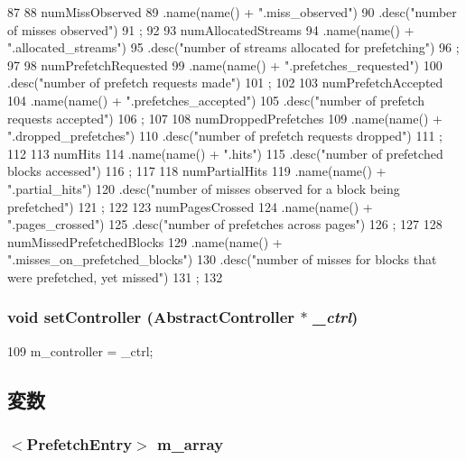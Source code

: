 \begin{DoxyCode}
87 {
88     numMissObserved
89         .name(name() + ".miss_observed")
90         .desc("number of misses observed")
91         ;
92 
93     numAllocatedStreams
94         .name(name() + ".allocated_streams")
95         .desc("number of streams allocated for prefetching")
96         ;
97 
98     numPrefetchRequested
99         .name(name() + ".prefetches_requested")
100         .desc("number of prefetch requests made")
101         ;
102 
103     numPrefetchAccepted
104         .name(name() + ".prefetches_accepted")
105         .desc("number of prefetch requests accepted")
106         ;
107 
108     numDroppedPrefetches
109         .name(name() + ".dropped_prefetches")
110         .desc("number of prefetch requests dropped")
111         ;
112 
113     numHits
114         .name(name() + ".hits")
115         .desc("number of prefetched blocks accessed")
116         ;
117 
118     numPartialHits
119         .name(name() + ".partial_hits")
120         .desc("number of misses observed for a block being prefetched")
121         ;
122 
123     numPagesCrossed
124         .name(name() + ".pages_crossed")
125         .desc("number of prefetches across pages")
126         ;
127 
128     numMissedPrefetchedBlocks
129         .name(name() + ".misses_on_prefetched_blocks")
130         .desc("number of misses for blocks that were prefetched, yet missed")
131         ;
132 }
\end{DoxyCode}
\hypertarget{classPrefetcher_ad1772ea493bb64a517a46484972c9efc}{
\subsubsection[{setController}]{\setlength{\rightskip}{0pt plus 5cm}void setController ({\bf AbstractController} $\ast$ {\em \_\-ctrl})}}
\label{classPrefetcher_ad1772ea493bb64a517a46484972c9efc}



\begin{DoxyCode}
109         { m_controller = _ctrl; }
\end{DoxyCode}


\subsection{変数}
\hypertarget{classPrefetcher_ac70c7174698e1bb57e75d7ee4d31db32}{
\subsubsection[{m\_\-array}]{$<${\bf PrefetchEntry}$>$ {\bf m\_\-array}}}
\label{classPrefetcher_ac70c7174698e1bb57e75d7ee4d31db32}


